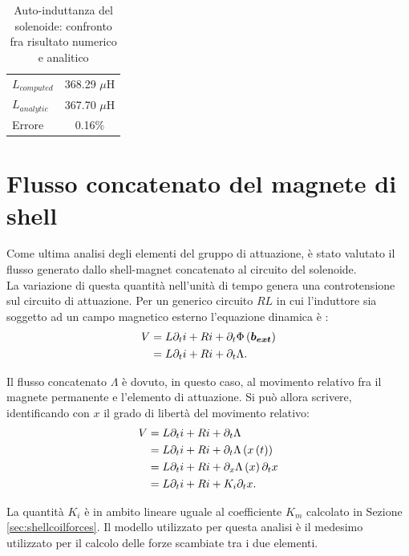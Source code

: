 \begin{table}[htb]
\centering
\caption{Auto-induttanza del solenoide: confronto fra risultato numerico e analitico}
\label{tab:M4coilind}
\begin{tabular}{lc}
\toprule
$L_{computed}$ & 368.29 $\mu$H\\
$L_{analytic}$ & 367.70 $\mu$H\\
Errore & 0.16\%\\
\bottomrule
\end{tabular}
\end{table}

\section{Flusso concatenato del magnete di shell}
\label{sec:concflux}
Come ultima analisi degli elementi del gruppo di attuazione, è stato valutato il flusso generato dallo shell-magnet concatenato al circuito del solenoide.\\

 La variazione di questa quantità nell'unità di tempo genera una controtensione sul circuito di attuazione. Per un generico circuito $RL$ in cui l'induttore sia soggetto ad un campo magnetico esterno l'equazione dinamica è \citep{furlani_permanent_2001}:
\begin{align}
\label{eq:6concflux1}
V &= L\partial_t i  +Ri + \partial_t\Phi\left(\boldsymbol{b_{ext}}\right)\nonumber\\
 ~& = L\partial_t i  +Ri + \partial_t\Lambda.
\end{align}

Il flusso concatenato $\Lambda$ è dovuto, in questo caso, al movimento relativo fra il magnete permanente e l'elemento di attuazione. Si può allora scrivere, identificando con $x$ il grado di libertà del movimento relativo:
\begin{align}
\label{eq:6concflux2}
V& = L\partial_t i  +Ri + \partial_t\Lambda\nonumber\\
& = L\partial_t i  +Ri + \partial_t\Lambda\left(x\left(t\right)\right)\nonumber\\
& = L\partial_t i  +Ri + \partial_x\Lambda\left(x\right) \partial_tx\nonumber\\
& = L\partial_t i  +Ri + K_i \partial_tx.
\end{align}

La quantità $K_i$ è in ambito lineare uguale al coefficiente $K_m$ calcolato in Sezione \ref{sec:shellcoilforces}. Il modello utilizzato per questa analisi è il medesimo utilizzato per il calcolo delle forze scambiate tra i due elementi.

